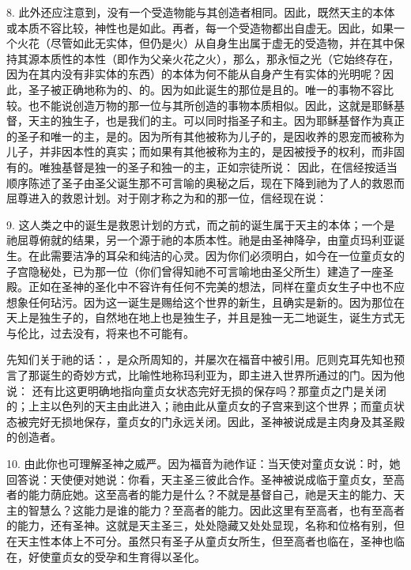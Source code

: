 8. 此外还应注意到，没有一个受造物能与其创造者相同。因此，既然天主的本体或本质不容比较，神性也是如此。再者，每一个受造物都出自虚无。因此，如果一个火花（尽管如此无实体，但仍是火）从自身生出属于虚无的受造物，并在其中保持其源本质性的本性（即作为父亲火花之火），那么，那永恒之光（它始终存在，因为在其内没有非实体的东西）的本体为何不能从自身产生有实体的光明呢？因此，圣子被正确地称为的、的。因为如此诞生的那位是且的。唯一的事物不容比较。也不能说创造万物的那一位与其所创造的事物本质相似。因此，这就是耶稣基督，天主的独生子，也是我们的主。可以同时指圣子和主。因为耶稣基督作为真正的圣子和唯一的主，是的。因为所有其他被称为儿子的，是因收养的恩宠而被称为儿子，并非因本性的真实；而如果有其他被称为主的，是因被授予的权利，而非固有的。唯独基督是独一的圣子和独一的主，正如宗徒所说： 因此，在信经按适当顺序陈述了圣子由圣父诞生那不可言喻的奥秘之后，现在下降到祂为了人的救恩而屈尊进入的救恩计划。对于刚才称之为和的那一位，信经现在说：\par

9.  这人类之中的诞生是救恩计划的方式，而之前的诞生属于天主的本体；一个是祂屈尊俯就的结果，另一个源于祂的本质本性。祂是由圣神降孕，由童贞玛利亚诞生。在此需要洁净的耳朵和纯洁的心灵。因为你们必须明白，如今在一位童贞女的子宫隐秘处，已为那一位（你们曾得知祂不可言喻地由圣父所生）建造了一座圣殿。正如在圣神的圣化中不容许有任何不完美的想法，同样在童贞女生子中也不应想象任何玷污。因为这一诞生是赐给这个世界的新生，且确实是新的。因为那位在天上是独生子的，自然地在地上也是独生子，并且是独一无二地诞生，诞生方式无与伦比，过去没有，将来也不可能有。\par

先知们关于祂的话：，是众所周知的，并屡次在福音中被引用。厄则克耳先知也预言了那诞生的奇妙方式，比喻性地称玛利亚为，即主进入世界所通过的门。因为他说： 还有比这更明确地指向童贞女状态完好无损的保存吗？那童贞之门是关闭的；上主以色列的天主由此进入；祂由此从童贞女的子宫来到这个世界；而童贞状态被完好无损地保存，童贞女的门永远关闭。因此，圣神被说成是主肉身及其圣殿的创造者。\par

10. 由此你也可理解圣神之威严。因为福音为祂作证：当天使对童贞女说：时，她回答说：天使便对她说：你看，天主圣三彼此合作。圣神被说成临于童贞女，至高者的能力荫庇她。这至高者的能力是什么？不就是基督自己，祂是天主的能力、天主的智慧么？这能力是谁的能力？至高者的能力。因此这里有至高者，也有至高者的能力，还有圣神。这就是天主圣三，处处隐藏又处处显现，名称和位格有别，但在天主性本体上不可分。虽然只有圣子从童贞女所生，但至高者也临在，圣神也临在，好使童贞女的受孕和生育得以圣化。\par

